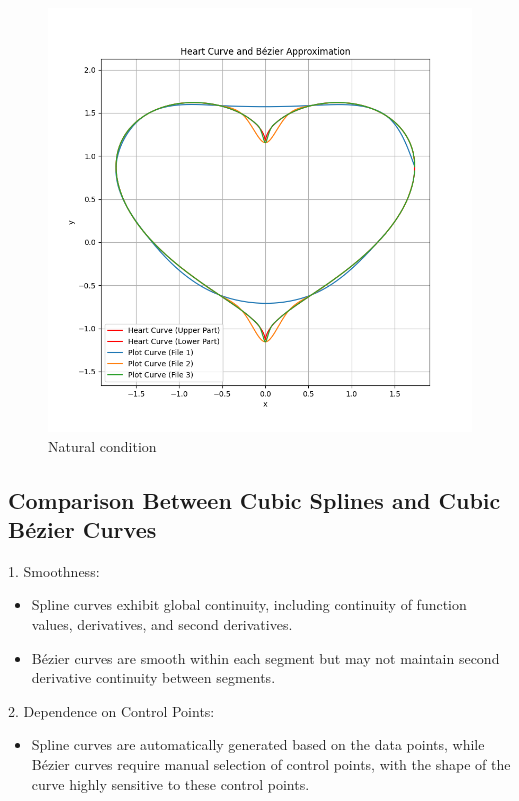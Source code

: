 \documentclass[a4paper]{article}
\begin{document}
\begin{figure}[h!]
\begin{minipage}{0.45\textwidth}
        \includegraphics[width=\linewidth]{../figure/E_natural.png}
        \caption{Natural condition}
    \end{minipage}
\end{figure}

\subsection*{Comparison Between Cubic Splines and Cubic Bézier Curves}
1. Smoothness:
\begin{itemize}
    \item Spline curves exhibit global continuity, including continuity of function values, derivatives, and second derivatives.
    \item Bézier curves are smooth within each segment but may not maintain second derivative continuity between segments.
\end{itemize}

2. Dependence on Control Points:
\begin{itemize}
    \item Spline curves are automatically generated based on the data points, while Bézier curves require manual selection of control points, with the shape of the curve highly sensitive to these control points.
\end{itemize}
\end{document}
